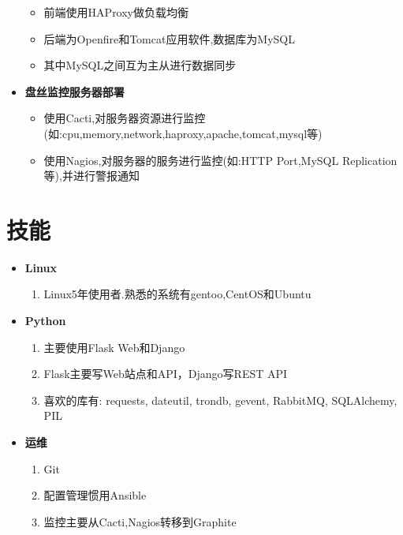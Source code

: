 \documentclass[11pt,letterpaper]{article}
\newcommand{\resitem}[1]{\item #1 \vspace{-2pt}}
\begin{document}
\begin{CJK}{UTF8}{gbsn}
\begin{itemize}
                       {\footnotesize
                       \begin{itemize}
                               \resitem{前端使用HAProxy做负载均衡}
                               \resitem{后端为Openfire和Tomcat应用软件,数据库为MySQL}
                               \resitem{其中MySQL之间互为主从进行数据同步}
                       \end{itemize}
                       } 
		   \item{\textbf{盘丝监控服务器部署}}\vspace{-6pt}
                       {\footnotesize
                       \begin{itemize}
                               \resitem{使用Cacti,对服务器资源进行监控(如:cpu,memory,network,haproxy,apache,tomcat,mysql等)}
                               \resitem{使用Nagios,对服务器的服务进行监控(如:HTTP Port,MySQL Replication等),并进行警报通知}
                       \end{itemize}
                       }
		\end{itemize}

\section{技能}
	\begin{itemize}
		\item
			\textbf{Linux}
			{ \footnotesize
			\begin{enumerate}
				\resitem{Linux5年使用者.熟悉的系统有gentoo,CentOS和Ubuntu}
			\end{enumerate}
			}
		\item
			\textbf{Python}
			{ \footnotesize
			\begin{enumerate}
				\resitem{主要使用Flask Web和Django}
				\resitem{Flask主要写Web站点和API，Django写REST API}
				\resitem{喜欢的库有: requests, dateutil, trondb, gevent, RabbitMQ, SQLAlchemy, PIL}
			\end{enumerate}
			}
		\item
			\textbf{运维}
			{ \footnotesize
			\begin{enumerate}
				\resitem{Git}
				\resitem{配置管理惯用Ansible}
				\resitem{监控主要从Cacti,Nagios转移到Graphite}
			\end{enumerate}
			}
	\end{itemize}

\end{CJK} 
\end{document}
